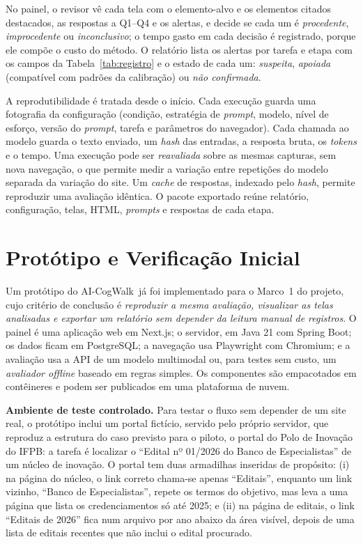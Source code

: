 \documentclass[12pt]{article}
\newcommand{\proj}{AI-CogWalk}
\begin{document}
No painel, o revisor vê cada tela com o elemento-alvo e os elementos citados destacados, as respostas a Q1--Q4 e os alertas, e decide se cada um é \textit{procedente}, \textit{improcedente} ou \textit{inconclusivo}; o tempo gasto em cada decisão é registrado, porque ele compõe o custo do método. O relatório lista os alertas por tarefa e etapa com os campos da Tabela~\ref{tab:registro} e o estado de cada um: \textit{suspeita}, \textit{apoiada} (compatível com padrões da calibração) ou \textit{não confirmada}.

A reprodutibilidade é tratada desde o início. Cada execução guarda uma fotografia da configuração (condição, estratégia de \textit{prompt}, modelo, nível de esforço, versão do \textit{prompt}, tarefa e parâmetros do navegador). Cada chamada ao modelo guarda o texto enviado, um \textit{hash} das entradas, a resposta bruta, os \textit{tokens} e o tempo. Uma execução pode ser \textit{reavaliada} sobre as mesmas capturas, sem nova navegação, o que permite medir a variação entre repetições do modelo separada da variação do site. Um \textit{cache} de respostas, indexado pelo \textit{hash}, permite reproduzir uma avaliação idêntica. O pacote exportado reúne relatório, configuração, telas, HTML, \textit{prompts} e respostas de cada etapa.

\section{Protótipo e Verificação Inicial}
\label{sec:prototipo}

Um protótipo do \proj\ já foi implementado para o Marco~1 do projeto, cujo critério de conclusão é \textit{reproduzir a mesma avaliação, visualizar as telas analisadas e exportar um relatório sem depender da leitura manual de registros}. O painel é uma aplicação web em Next.js; o servidor, em Java 21 com Spring Boot; os dados ficam em PostgreSQL; a navegação usa Playwright com Chromium; e a avaliação usa a API de um modelo multimodal ou, para testes sem custo, um \textit{avaliador offline} baseado em regras simples. Os componentes são empacotados em contêineres e podem ser publicados em uma plataforma de nuvem.

\textbf{Ambiente de teste controlado.} Para testar o fluxo sem depender de um site real, o protótipo inclui um portal fictício, servido pelo próprio servidor, que reproduz a estrutura do caso previsto para o piloto, o portal do Polo de Inovação do IFPB: a tarefa é localizar o ``Edital nº 01/2026 do Banco de Especialistas'' de um núcleo de inovação. O portal tem duas armadilhas inseridas de propósito: (i) na página do núcleo, o link correto chama-se apenas ``Editais'', enquanto um link vizinho, ``Banco de Especialistas'', repete os termos do objetivo, mas leva a uma página que lista os credenciamentos só até 2025; e (ii) na página de editais, o link ``Editais de 2026'' fica num arquivo por ano abaixo da área visível, depois de uma lista de editais recentes que não inclui o edital procurado.
\end{document}
